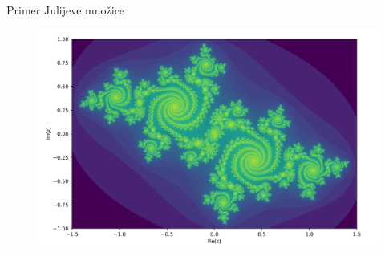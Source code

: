 \documentclass{beamer}
\theoremstyle{definition}
\begin{document}
\begin{frame}{Primer Julijeve množice}
\begin{figure}
    \includegraphics[scale=0.25]{julia_set.png}
\end{figure}
\end{frame}
\end{document}
